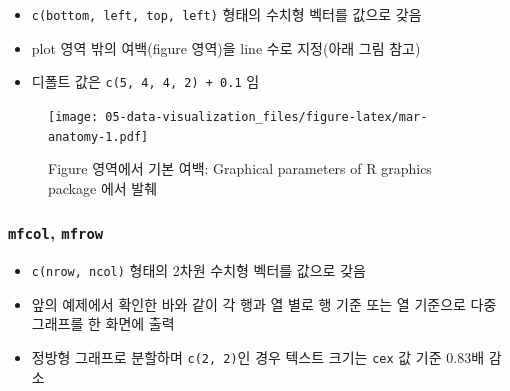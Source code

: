 \documentclass[
  11pt,
]{krantz}
\makeatletter
\providecommand{\tightlist}{%
  \setlength{\itemsep}{0pt}\setlength{\parskip}{0pt}}
\newenvironment{kframe}{%
\medskip{}
\setlength{\fboxsep}{.8em}
 \def\at@end@of@kframe{}%
 \ifinner\ifhmode%
  \def\at@end@of@kframe{\end{minipage}}%
  \begin{minipage}{\columnwidth}%
 \fi\fi%
 \def\FrameCommand##1{\hskip\@totalleftmargin \hskip-\fboxsep
 \colorbox{shadecolor}{##1}\hskip-\fboxsep
     \hskip-\linewidth \hskip-\@totalleftmargin \hskip\columnwidth}%
 \MakeFramed {\advance\hsize-\width
   \@totalleftmargin\z@ \linewidth\hsize
   \@setminipage}}%
 {\par\unskip\endMakeFramed%
 \at@end@of@kframe}
\renewenvironment{quote}{\begin{kframe}}{\end{kframe}}
\makeatother
\begin{document}
\begin{quote}
\begin{itemize}
\tightlist
\item
  \texttt{c(bottom,\ left,\ top,\ left)} 형태의 수치형 벡터를 값으로 갖음
\item
  plot 영역 밖의 여백(figure 영역)을 line 수로 지정(아래 그림 참고)
\item
  디폴트 값은 \texttt{c(5,\ 4,\ 4,\ 2)\ +\ 0.1} 임
\end{itemize}
\end{quote}

\footnotesize

\begin{figure}
\centering
\texttt{[image: 05-data-visualization\_files/figure-latex/mar-anatomy-1.pdf]}
\caption{\label{fig:mar-anatomy}Figure 영역에서 기본 여백: Graphical parameters of R graphics package 에서 발췌}
\end{figure}

\normalsize

\hypertarget{mfrow-mfcol}{%
\subsubsection*{\texorpdfstring{\textbf{\texttt{mfcol}, \texttt{mfrow}}}{mfcol, mfrow}}\label{mfrow-mfcol}}


\begin{quote}
\begin{itemize}
\tightlist
\item
  \texttt{c(nrow,\ ncol)} 형태의 2차원 수치형 벡터를 값으로 갖음
\item
  앞의 예제에서 확인한 바와 같이 각 행과 열 별로 행 기준 또는 열 기준으로 다중 그래프를 한 화면에 출력
\item
  정방형 그래프로 분할하며 \texttt{c(2,\ 2)}인 경우 텍스트 크기는 \texttt{cex} 값 기준 0.83배 감소
\end{itemize}
\end{quote}

\footnotesize
\end{document}
